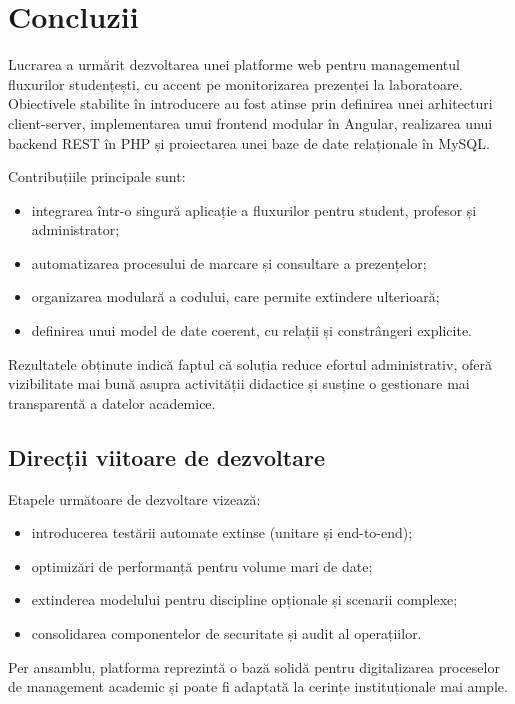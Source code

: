 \chapter{Concluzii}
\label{cap:cap5}

Lucrarea a urmărit dezvoltarea unei platforme web pentru managementul
fluxurilor studențești, cu accent pe monitorizarea prezenței la laboratoare.
Obiectivele stabilite în introducere au fost atinse prin definirea unei
arhitecturi client-server, implementarea unui frontend modular în Angular,
realizarea unui backend REST în PHP și proiectarea unei baze de date relaționale
în MySQL.

Contribuțiile principale sunt:

\begin{itemize}
    \item integrarea într-o singură aplicație a fluxurilor pentru student,
          profesor și administrator;
    \item automatizarea procesului de marcare și consultare a prezențelor;
    \item organizarea modulară a codului, care permite extindere ulterioară;
    \item definirea unui model de date coerent, cu relații și constrângeri explicite.
\end{itemize}

Rezultatele obținute indică faptul că soluția reduce efortul administrativ,
oferă vizibilitate mai bună asupra activității didactice și susține o
gestionare mai transparentă a datelor academice.

\section{Direcții viitoare de dezvoltare}
\label{cap:cap5:directii-viitoare}

Etapele următoare de dezvoltare vizează:

\begin{itemize}
    \item introducerea testării automate extinse (unitare și end-to-end);
    \item optimizări de performanță pentru volume mari de date;
    \item extinderea modelului pentru discipline opționale și scenarii complexe;
    \item consolidarea componentelor de securitate și audit al operațiilor.
\end{itemize}

Per ansamblu, platforma reprezintă o bază solidă pentru digitalizarea
proceselor de management academic și poate fi adaptată la cerințe instituționale
mai ample.
